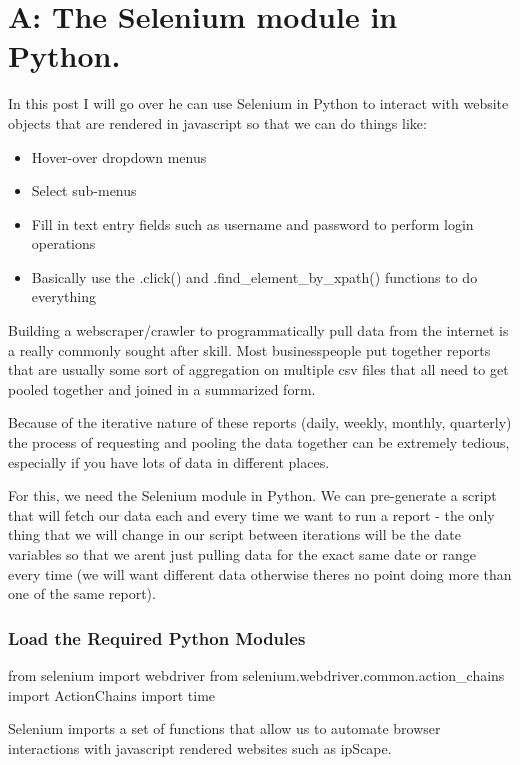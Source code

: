 \documentclass[]{article}
\providecommand{\tightlist}{%
  \setlength{\itemsep}{0pt}\setlength{\parskip}{0pt}}
\begin{document}
\section{A: The Selenium module in
Python.}\label{a-the-selenium-module-in-python.}

In this post I will go over he can use Selenium in Python to interact
with website objects that are rendered in javascript so that we can do
things like:

\begin{itemize}
\tightlist
\item
  Hover-over dropdown menus
\item
  Select sub-menus
\item
  Fill in text entry fields such as username and password to perform
  login operations
\item
  Basically use the .click() and .find\_element\_by\_xpath() functions
  to do everything
\end{itemize}

Building a webscraper/crawler to programmatically pull data from the
internet is a really commonly sought after skill. Most businesspeople
put together reports that are usually some sort of aggregation on
multiple csv files that all need to get pooled together and joined in a
summarized form.

Because of the iterative nature of these reports (daily, weekly,
monthly, quarterly) the process of requesting and pooling the data
together can be extremely tedious, especially if you have lots of data
in different places.

For this, we need the Selenium module in Python. We can pre-generate a
script that will fetch our data each and every time we want to run a
report - the only thing that we will change in our script between
iterations will be the date variables so that we arent just pulling data
for the exact same date or range every time (we will want different data
otherwise theres no point doing more than one of the same report).

\subsubsection{Load the Required Python
Modules}\label{load-the-required-python-modules}

from selenium import webdriver from
selenium.webdriver.common.action\_chains import ActionChains import time

Selenium imports a set of functions that allow us to automate browser
interactions with javascript rendered websites such as ipScape.
\end{document}
